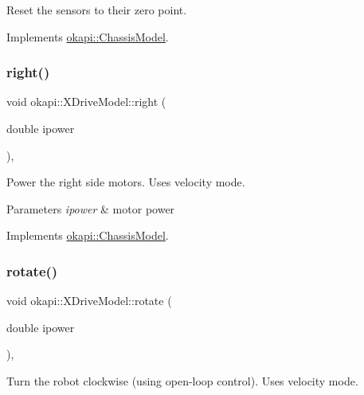 Reset the sensors to their zero point. 

Implements \mbox{\hyperlink{classokapi_1_1ChassisModel_a6bd7e6bb60d41d3f1f5a5a129acfe1b6}{okapi\+::\+Chassis\+Model}}.

\mbox{\label{classokapi_1_1XDriveModel_a21bc8f93cda3b0b58ec6543a6dc02c24}} 
\subsubsection{\texorpdfstring{right()}{right()}}
{\footnotesize\ttfamily void okapi\+::\+X\+Drive\+Model\+::right (\begin{DoxyParamCaption}\item[{double}]{ipower }\end{DoxyParamCaption})\hspace{0.3cm}{\ttfamily [override]}, {\ttfamily [virtual]}}

Power the right side motors. Uses velocity mode.


\begin{DoxyParams}{Parameters}
{\em ipower} & motor power \\
\hline
\end{DoxyParams}


Implements \mbox{\hyperlink{classokapi_1_1ChassisModel_a282fcf947aea9630cadd2c673eb5f7e3}{okapi\+::\+Chassis\+Model}}.

\mbox{\label{classokapi_1_1XDriveModel_ab9a2d6f5e1f44b2c8640d41a534d4869}} 
\subsubsection{\texorpdfstring{rotate()}{rotate()}}
{\footnotesize\ttfamily void okapi\+::\+X\+Drive\+Model\+::rotate (\begin{DoxyParamCaption}\item[{double}]{ipower }\end{DoxyParamCaption})\hspace{0.3cm}{\ttfamily [override]}, {\ttfamily [virtual]}}

Turn the robot clockwise (using open-\/loop control). Uses velocity mode.


